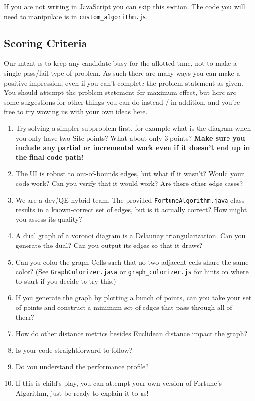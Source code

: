 \documentclass[12pt]{article}
\newcommand{\nl}{\newline}
\begin{document}
If you are not writing in JavaScript you can skip this section.\nl
The code you will need to manipulate is in \texttt{custom\_algorithm.js}.

\subsection*{Scoring Criteria}

Our intent is to keep any candidate busy for the allotted time, not to make a
single pass/fail type of problem. As such there are many ways you can make a
positive impression, even if you can't complete the problem statement as given.
You should attempt the problem statement for maximum effect, but here are some
suggestions for other things you can do instead / in addition, and you're free
to try wowing us with your own ideas here.

\newpage
\begin{enumerate}
  \item Try solving a simpler subproblem first, for example what is the diagram
    when you only have two Site points? What about only 3 points? \textbf{Make
    sure you include any partial or incremental work even if it doesn't end up in the final code
    path!}
  \item The UI is robust to out-of-bounds edges, but what if it wasn't? Would
    your code work? Can you verify that it would work? Are there other edge
    cases?
  \item We are a dev/QE hybrid team. The provided \texttt{FortuneAlgorithm.java}
    class results in a known-correct set of edges, but is it actually correct?
    How might you assess its quality?
  \item A dual graph of a voronoi diagram is a Delaunay triangularization. Can
    you generate the dual? Can you output its edges so that it draws?
  \item Can you color the graph Cells such that no two adjacent cells share the
    same color? (See \texttt{GraphColorizer.java} or
    \texttt{graph\_colorizer.js} for hints on where to start if you decide to
    try this.)
  \item If you generate the graph by plotting a bunch of points, can you take
    your set of points and construct a minimum set of edges that pass through
    all of them?
  \item How do other distance metrics besides Euclidean distance impact the
    graph?
  \item Is your code straightforward to follow?
  \item Do you understand the performance profile?
  \item If this is child's play, you can attempt your own version of Fortune's
    Algorithm, just be ready to explain it to us!

\end{enumerate}
\end{document}
